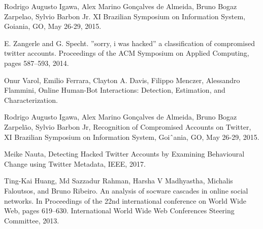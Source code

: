 \documentclass[conference]{IEEEtran}
\begin{document}
\begin{enumerate}[label={[\arabic*]}]
\item Rodrigo Augusto Igawa, Alex Marino Gonçalves de Almeida, Bruno Bogaz Zarpelao, Sylvio Barbon Jr.
XI Brazilian Symposium on Information System, Goiania, GO, May 26-29, 2015.

\item E. Zangerle and G. Specht. ”sorry, i was hacked” a
classification of compromised twitter accounts.
Proceedings of the ACM Symposium on Applied
Computing, pages 587–593, 2014.
\item Onur Varol, Emilio Ferrara, Clayton A. Davis, Filippo Menczer, Alessandro Flammini, Online Human-Bot Interactions: Detection, Estimation, and Characterization.
\item Rodrigo Augusto Igawa, Alex Marino Gonçalves de Almeida, Bruno Bogaz Zarpelão, Sylvio Barbon Jr,
Recognition of Compromised Accounts on Twitter, XI Brazilian Symposium on Information System, Goiˆania, GO, May 26-29, 2015.
\item Meike Nauta, Detecting Hacked Twitter Accounts by Examining
Behavioural Change using Twitter Metadata, IEEE, 2017.
\item Ting-Kai Huang, Md Sazzadur Rahman, Harsha V
Madhyastha, Michalis Faloutsos, and Bruno Ribeiro. An
analysis of socware cascades in online social networks.
In Proceedings of the 22nd international conference on
World Wide Web, pages 619–630. International World
Wide Web Conferences Steering Committee, 2013.


\end{enumerate}
\end{document}
